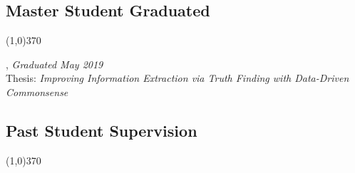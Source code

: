 \documentclass[10pt]{article}
\newenvironment{myindentpar}[1]%
{\begin{list}{}%
         {\setlength{\leftmargin}{#1}}%
         \item[]%
}
{\end{list}}
\newcounter{list}
\begin{document}
\subsection{\sc Master Student Graduated}
\vspace{-0.4cm} \line(1,0){370} \vspace{-0.1cm}

\begin{myindentpar}{0.75cm}

\hspace{-0.75cm}{\bf Xueying Wang}, \emph{Graduated May 2019} \\
	{\small Thesis: \emph{Improving Information Extraction via Truth Finding with Data-Driven Commonsense}}

\end{myindentpar}

\subsection{\sc Past Student Supervision}
\vspace{-0.4cm} \line(1,0){370} \vspace{-0.1cm}
\end{document}
